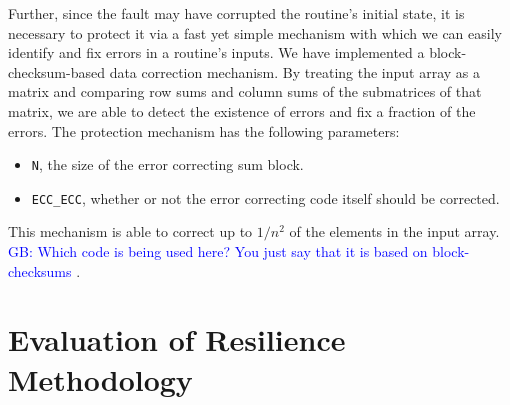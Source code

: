 \documentclass[prodmode,acmtecs]{acmsmall} %
\newcommand{\greg}[1]{%
  \textcolor{blue}{GB: #1}
}
\begin{document}
Further, since the fault may have corrupted the routine's initial state, it is necessary to protect it via a fast yet simple mechanism with which we can easily identify and fix errors in a routine's inputs. 
We have implemented a block-checksum-based data correction mechanism. 
By treating the input array as a matrix and comparing row sums and column sums of the submatrices of that matrix, we are able to detect the existence of errors and fix a fraction of the errors. 
The protection mechanism has the following parameters:
\begin{itemize}
\item{\texttt{N}, the size of the error correcting sum block.}
\item{\texttt{ECC\_ECC}, whether or not the error correcting code itself should be corrected.}
\end{itemize}
This mechanism is able to correct up to $1/{n^2}$ of the elements in the input array.
\greg{Which code is being used here? You just say that it is based on block-checksums}.

\section{Evaluation of Resilience Methodology}
\label{sec:eval}
\end{document}
